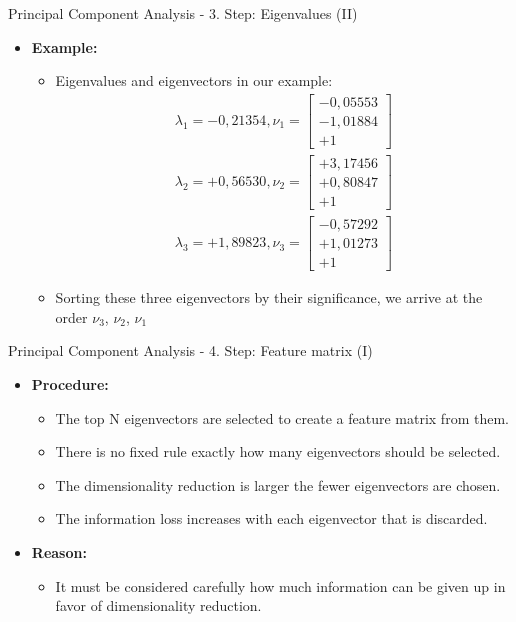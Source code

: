 \begin{frame}{Principal Component Analysis - 3. Step: Eigenvalues (II)}
	\begin{itemize}
		\item \textbf{Example:}
		\begin{itemize}
			\item Eigenvalues and eigenvectors in our example: \\
			\begin{align}
				\lambda_1 = -0,21354, 
				\nu_1 = \begin{bmatrix} -0,05553 \\ -1,01884 \\ +1 
				\end{bmatrix} 
				\\
				\lambda_2 = +0,56530, 
				\nu_2 = \begin{bmatrix} +3,17456 \\ +0,80847 \\ +1 
				\end{bmatrix} 
				\\
				\lambda_3 = +1,89823, 
				\nu_3 = \begin{bmatrix} -0,57292 \\ +1,01273 \\ +1 \end{bmatrix}
			\end{align}
			\item Sorting these three eigenvectors by their significance, we 
			arrive at the order $\nu_3$, $\nu_2$, $\nu_1$
		\end{itemize}
	\end{itemize}
\end{frame}

\begin{frame}{Principal Component Analysis - 4. Step: Feature matrix (I)}
	\begin{itemize}
		\item \textbf{Procedure:}
		\begin{itemize}
			\item The top N eigenvectors are selected to create a feature 
			matrix from them.
			\item There is no fixed rule exactly how many eigenvectors should 
			be selected. 
			\item The dimensionality reduction is larger the 
			fewer eigenvectors are chosen.
			\item The information loss increases with each eigenvector that is 
			discarded.
		\end{itemize}
		\item \textbf{Reason:}
		\begin{itemize}
			\item It must be considered carefully how much information can be 
			given up in favor of dimensionality reduction.
		\end{itemize}
	\end{itemize}
\end{frame}

